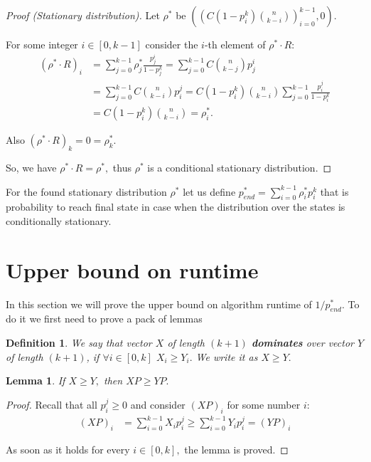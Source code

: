 \documentclass{article}
\newtheorem{lemma}{Lemma}
\newtheorem{definition}{Definition}
\begin{document}
\begin{proof}[Proof (Stationary distribution)]
Let $\rho^*$ be $\left(\left(C (1 - p_i^k) \binom{n}{k - i}\right)_{i = 0}^{k - 1}, 0 \right)$.

For some integer $i \in [0, k - 1]$ consider the $i$-th element of $\rho^* \cdot R$:
\begin{align*}
(\rho^* \cdot R)_i &= \sum\limits_{j = 0}^{k - 1} \rho_j^* \frac{p_j^i}{1 - p_j^k} = \sum\limits_{j = 0}^{k - 1} C \binom{n}{k - j} p_j^i \\
&= \sum\limits_{j = 0}^{k - 1} C \binom{n}{k - i} p_i^j = C (1 - p_i^k) \binom{n}{k - i} \sum\limits_{j = 0}^{k - 1} \frac{p_i^j}{1 - p_i^k} \\
&= C (1 - p_i^k) \binom{n}{k - i} = \rho_i^*.
\end{align*}

Also $(\rho^* \cdot R)_k = 0 = \rho_k^*.$

So, we have $\rho^* \cdot R = \rho^*,$ thus $\rho^*$ is a conditional stationary distribution.
\end{proof}

For the found stationary distribution $\rho^*$ let us define $p_{end}^* = \sum\limits_{i = 0}^{k - 1} \rho_i^* p_i^k$ that is probability to reach final state in case when the distribution over the states is conditionally stationary.

\section{Upper bound on runtime}

In this section we will prove the upper bound on algorithm runtime of $1/p_{end}^*.$ To do it we first need to prove a pack of lemmas

\begin{definition}
We say that vector $X$ of length $(k + 1)$ \textbf{dominates} over vector $Y$ of length $(k + 1)$, if $\forall i \in [0, k]$ $X_i \ge Y_i.$ We write it as $X \ge Y.$
\end{definition}

\begin{lemma}\label{vector_domination}
If $X \ge Y,$ then $X P \ge Y P.$
\end{lemma}

\begin{proof}
  Recall that all $p_i^j \ge 0$ and consider $(X P)_i$ for some number $i:$
  \begin{align*}
    (X P)_i &= \sum\limits_{i = 0}^{k - 1} X_i p_i^j \ge \sum\limits_{i = 0}^{k - 1} Y_i p_i^j = (Y P)_i
  \end{align*}

  As soon as it holds for every $i \in [0, k],$ the lemma is proved.
\end{proof}
\end{document}
